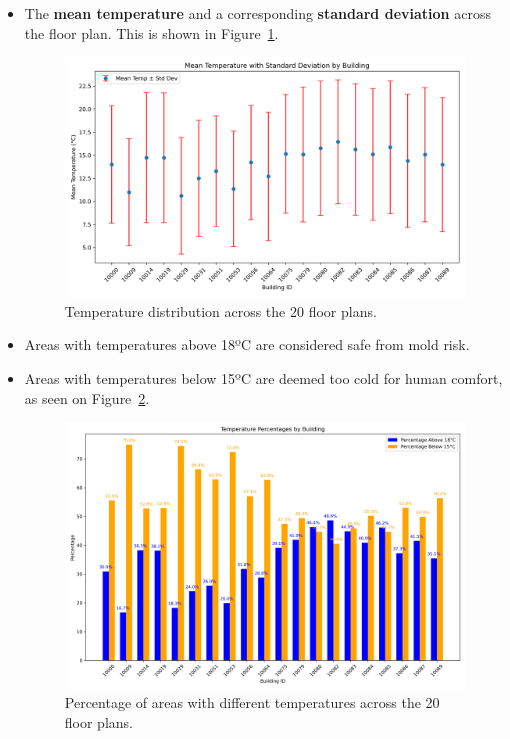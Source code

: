 \documentclass[a4paper,12pt]{article}
\begin{document}
\begin{itemize}
        \item The \textbf{mean temperature} and a corresponding \textbf{standard deviation} across the floor plan. This is shown in Figure~\ref{fig:temperature_distribution}.

        \begin{figure}[h!]
                \centering
                \includegraphics[width=1\textwidth]{GeneralPlots/mean_temp_with_std_dev.png}
                \caption{Temperature distribution across the 20 floor plans.}
                \label{fig:temperature_distribution}
        \end{figure}

        \item Areas with temperatures above 18ºC are considered safe from mold risk.
        \item Areas with temperatures below 15ºC are deemed too cold for human comfort, as seen on Figure~\ref{fig:temperature_distribution_precentage}.
        \begin{figure}[h!]
                \centering
                \includegraphics[width=1\textwidth]{GeneralPlots/temperature_percentages_by_building.png}
                \caption{Percentage of areas with different temperatures across the 20 floor plans.}
                \label{fig:temperature_distribution_precentage}
        \end{figure}

\end{itemize}
\end{document}
